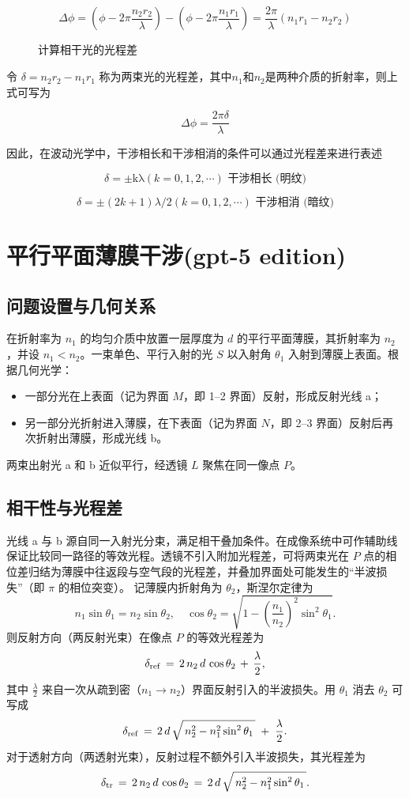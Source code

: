 \documentclass[withoutpreface,bwprint]{cumcmthesis} %
\begin{document}
\[\Delta\phi = \left( \phi - 2\pi\frac{n_{2}r_{2}}{\lambda} \right) - \left( \phi - 2\pi\frac{n_{1}r_{1}}{\lambda} \right) = \frac{2\pi}{\lambda}\left( n_{1}r_{1} - n_{2}r_{2} \right)\]

\begin{figure}[ht]
    \centering
    \fbox{\rule{2cm}{0pt} \rule{0pt}{2cm}} %
    \caption{计算相干光的光程差}
    \label{fig:3}
\end{figure}
令 $\delta = n_2 r_2 - n_1 r_1$ 称为两束光的光程差，其中$n_1$和$n_2$是两种介质的折射率，则上式可写为


\[\Delta\phi = \frac{2 \pi\delta }{\lambda}\]


因此，在波动光学中，干涉相长和干涉相消的条件可以通过光程差来进行表述

\[\delta = \pm \text{kλ}(k = 0,1,2,\cdots)\text{~}\text{干涉相长}\text{\ (}\text{明纹}\text{)}\]

\[\delta = \pm (2k + 1)\lambda/2(k = 0,1,2,\cdots)\text{~}\text{干涉相消}\text{\ (}\text{暗纹}\text{)}\]



\section{平行平面薄膜干涉(gpt-5 edition)}
\subsection{问题设置与几何关系}
在折射率为 \(n_1\) 的均匀介质中放置一层厚度为 \(d\) 的平行平面薄膜，其折射率为 \(n_2\)，并设 \(n_1<n_2\)。一束单色、平行入射的光 \(S\) 以入射角 \(\theta_1\) 入射到薄膜上表面。根据几何光学：
\begin{itemize}
    \item 一部分光在上表面（记为界面 \(M\)，即 1--2 界面）反射，形成反射光线 a；
    \item 另一部分光折射进入薄膜，在下表面（记为界面 \(N\)，即 2--3 界面）反射后再次折射出薄膜，形成光线 b。
\end{itemize}
两束出射光 a 和 b 近似平行，经透镜 \(L\) 聚焦在同一像点 \(P\)。

\subsection{相干性与光程差}
光线 a 与 b 源自同一入射光分束，满足相干叠加条件。在成像系统中可作辅助线保证比较同一路径的等效光程。透镜不引入附加光程差，可将两束光在 \(P\) 点的相位差归结为薄膜中往返段与空气段的光程差，并叠加界面处可能发生的“半波损失”（即 \(\pi\) 的相位突变）。
记薄膜内折射角为 \(\theta_2\)，斯涅尔定律为
\[
    n_1\sin\theta_1=n_2\sin\theta_2,\quad \cos\theta_2=\sqrt{1-\left(\frac{n_1}{n_2}\right)^2\sin^2\theta_1}.
\]
则反射方向（两反射光束）在像点 \(P\) 的等效光程差为
\[
    \delta_{\rm ref} \,=\, 2\,n_2\,d\,\cos\theta_2 \, + \, \frac{\lambda}{2},
\]
其中 \(\tfrac{\lambda}{2}\) 来自一次从疏到密（\(n_1\to n_2\)）界面反射引入的半波损失。用 \(\theta_1\) 消去 \(\theta_2\) 可写成
\[
    \delta_{\rm ref} \,=\, 2\,d\,\sqrt{\,n_2^2 - n_1^2\sin^2\theta_1\,}\; +\; \frac{\lambda}{2}.
\]
对于透射方向（两透射光束），反射过程不额外引入半波损失，其光程差为
\[
    \delta_{\rm tr} \,=\, 2\,n_2\,d\,\cos\theta_2 \,=\, 2\,d\,\sqrt{\,n_2^2 - n_1^2\sin^2\theta_1\,}.
\]
\end{document}
